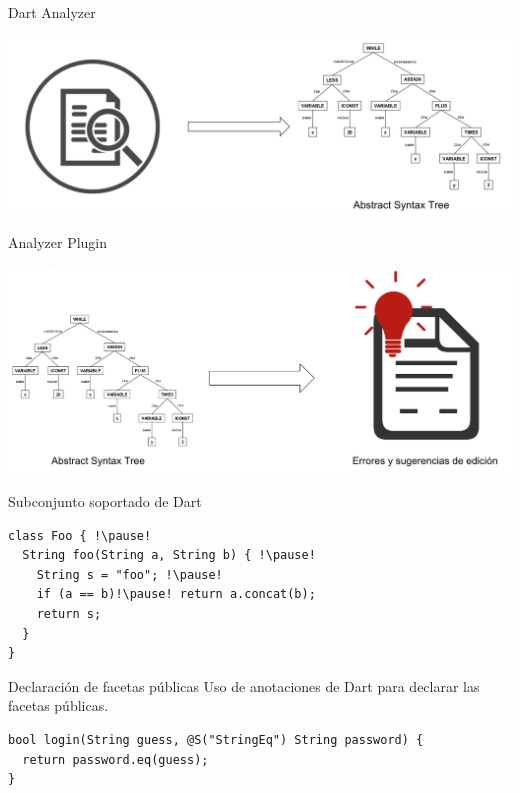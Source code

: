 \documentclass[aspectratio=169,10pt]{beamer}
\begin{document}
\begin{frame}[fragile]{Dart Analyzer}
	\begin{center}
		\includegraphics[width=1.0\textwidth]{images/ast.png}
	\end{center}
\end{frame}

\begin{frame}[fragile]{Analyzer Plugin}
		\begin{center}
      \includegraphics[width=1.0\textwidth]{images/plugin.png}
		\end{center}
\end{frame}

\begin{frame}[fragile]{Subconjunto soportado de Dart}
	\begin{center}
	\begin{lstlisting}[escapechar=!,basicstyle=\fontsize{9}{11}\ttfamily]
class Foo { !\pause!
  String foo(String a, String b) { !\pause!
    String s = "foo"; !\pause!
    if (a == b)!\pause! return a.concat(b);
    return s;
  }
}
  \end{lstlisting}
	\end{center}
\end{frame}

\begin{frame}[fragile]{Declaración de facetas públicas}
	Uso de anotaciones de Dart para declarar las facetas públicas. \\ \pause
	\vspace{1cm}
\begin{lstlisting}[escapechar=?,basicstyle=\fontsize{9}{9}\ttfamily]
bool login(String guess, @S("StringEq") String password) {
  return password.eq(guess);
}
\end{lstlisting}
\end{frame}
\end{document}
